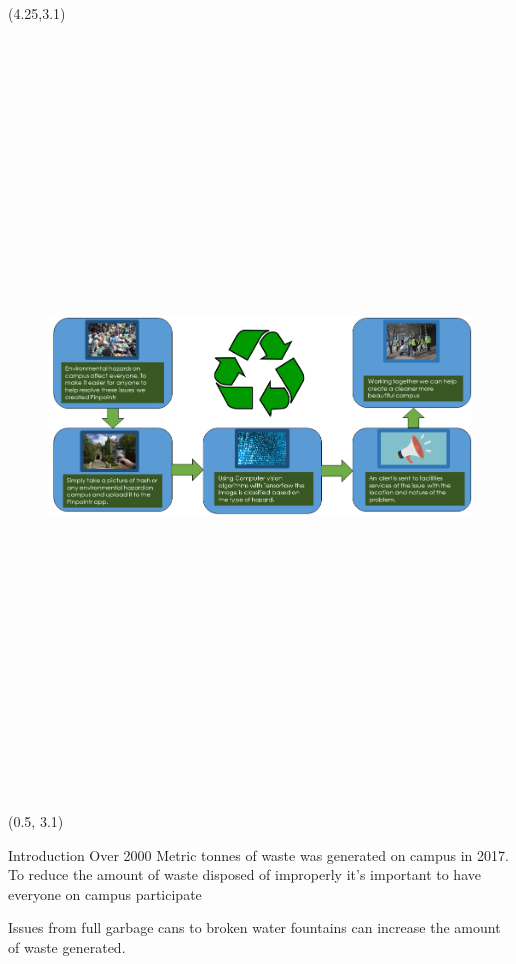 \documentclass[22pt]{beamer}
\begin{document}
\begin{frame}[fragile]
\begin{textblock}{7}(4.25,3.1)
\begin{figure}[htbp] %
 \centering
\includegraphics[height=20cm]{flowchart.png}
\end{figure}
\end{textblock}

\begin{textblock}{3.5}(0.5, 3.1)
\begin{block}{Introduction}
Over 2000 Metric tonnes of waste was generated on campus in 2017. To reduce the amount of waste disposed of improperly it’s important to have everyone on campus participate \par

Issues from full garbage cans to broken water fountains can increase the amount of waste generated. \par


\end{block}
\end{textblock}
\end{frame}
\end{document}
